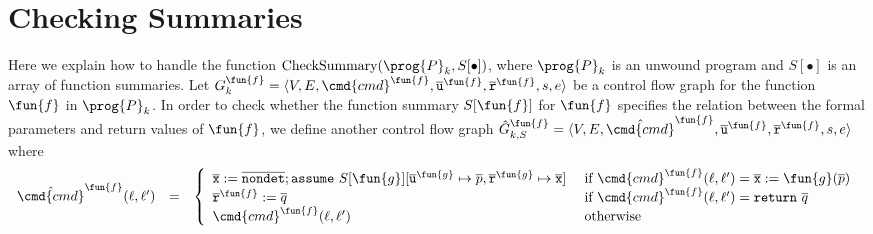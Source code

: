 
\section{Checking Summaries}\label{sec:checking-summary}

Here we explain how to handle the function $\textmd{CheckSummary} (\prog{P}_k, S[\bullet])$, where $\prog{P}_k$ is an unwound program and $S[\bullet]$ is an
array of function summaries.
Let $G^\fun{f}_k = \langle V, E, \cmd{cmd}^\fun{f}, \overline{\mathtt{u}}^\fun{f}, \overline{\mathtt{r}}^\fun{f},s,e \rangle$ be a
control flow graph for the function $\fun{f}$ in $\prog{P}_k$. In order to check whether the function
summary $S[{\fun{f}}]$ for $\fun{f}$ specifies the relation
between the formal parameters and return values of $\fun{f}$,
we define another control flow graph
$\hat{G}^\fun{f}_{k,S} = \langle V, E, \hat{\cmd{cmd}}^\fun{f}, \overline{\mathtt{u}}^\fun{f}, \overline{\mathtt{r}}^\fun{f},s,e \rangle$ where
\begin{equation*}
  \begin{array}{rcl}
    \hat{\cmd{cmd}}^\fun{f} (\ell, \ell') & = &
    \left\{
      \begin{array}{ll}
        \overline{\mathtt{x}} := 
        \overline{\mathtt{nondet}};
        \mathtt{assume\ }S[{\fun{g}}][
        \overline{\mathtt{u}}^\fun{g} \mapsto \overline{p},
        \overline{\mathtt{r}}^\fun{g} \mapsto \overline{\mathtt{x}}]
        &
        \text{ if } \cmd{cmd}^\fun{f} (\ell, \ell') =
        \overline{\mathtt{x}} := \fun{g} (\overline{p})\\
		\overline{\mathtt{r}}^\fun{f} := \overline{q}
        &
        \text{ if } \cmd{cmd}^\fun{f} (\ell, \ell') = \mathtt{return\ }
        \overline{q}\\
        \cmd{cmd}^\fun{f} (\ell, \ell')
        &
		\text{ otherwise}
      \end{array}
    \right.
  \end{array}
\end{equation*}

